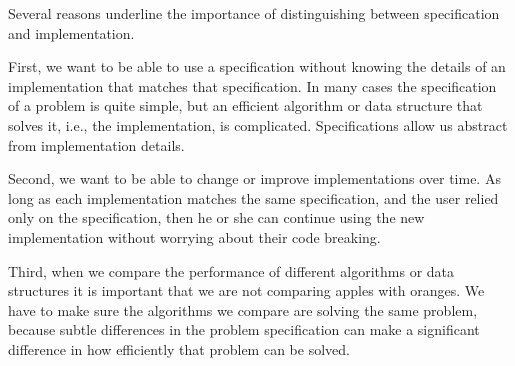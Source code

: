 \begin{remark}
%
Several reasons underline the importance of distinguishing between
specification and implementation.  

First, we want to be able to use a specification without knowing the
details of an implementation that matches that specification.
%
In many cases the specification of a problem is quite simple, but an
efficient algorithm or data structure that solves it, i.e., the
implementation, is complicated.  
%
Specifications allow us abstract from implementation details.
%

Second, we want to be able to change or improve implementations over
time.  As long as each implementation matches the same specification,
and the user relied only on the specification, then he or she can
continue using the new implementation without worrying about their
code breaking. 
%

Third, when we compare the performance of different
algorithms or data structures it is important that we are not
comparing apples with oranges.  We have to make sure the algorithms we
compare are solving the same problem, because subtle differences in
the problem specification can make a significant difference in how
efficiently that problem can be solved.
\end{remark}
